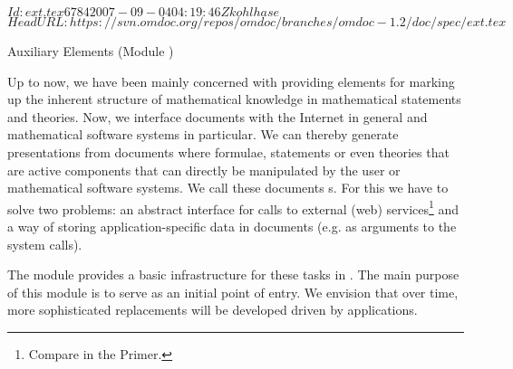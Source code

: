 \svnInfo $Id: ext.tex 6784 2007-09-04 04:19:46Z kohlhase $
\svnKeyword $HeadURL: https://svn.omdoc.org/repos/omdoc/branches/omdoc-1.2/doc/spec/ext.tex $

\begin{tchapter}[id=ext,short=Auxiliary Elements]{Auxiliary Elements (Module {})}

  Up to now, we have been mainly concerned with providing elements for marking up the
  inherent structure of mathematical knowledge in mathematical statements and
  theories. Now, we interface {\omdoc} documents with the Internet in general and
  mathematical software systems in particular. We can thereby generate presentations from
  {\omdoc} documents where formulae, statements or even theories that are active
  components that can directly be manipulated by the user or mathematical software
  systems. We call these documents {s}.  For this we have to
  solve two problems: an abstract interface for calls to external (web)
  services\footnote{Compare {} in the {\omdoc} Primer.} and a way of
  storing application-specific data in {\omdoc} documents (e.g. as arguments to the system
  calls).

  The module {} provides a basic infrastructure for these tasks in
  {\omdoc}. The main purpose of this module is to serve as an initial point of entry. We
  envision that over time, more sophisticated replacements will be developed driven by
  applications.


\end{tchapter}
